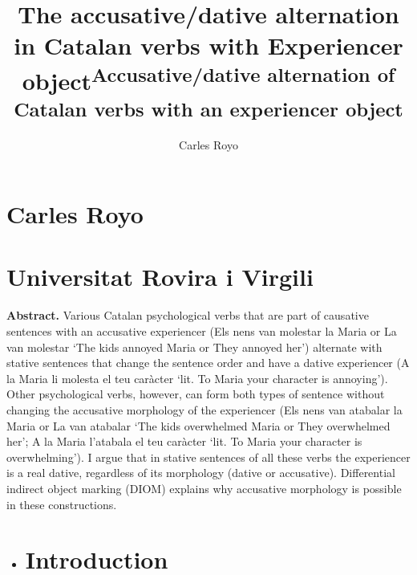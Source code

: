 \documentclass[output=paper,modfonts,nonflat]{langsci/langscibook}
\author{Carles Royo\affiliation{}}
\title{The accusative/dative alternation in Catalan verbs with Experiencer object}
\begin{document}
\maketitle 

\title{\textsuperscript{Accusative/dative alternation of Catalan verbs with an experiencer object}}

\section{}
\section{\textbf{Carles} \textbf{Royo}}
\section{\textbf{Universitat} \textbf{Rovira} \textbf{i} \textbf{Virgili}}
\begin{stylelsAbstract}
\textbf{Abstract.} Various Catalan psychological verbs that are part of causative sentences with an accusative experiencer (\textup{Els nens van molestar la Maria} or \textup{La van molestar} ‘The kids annoyed Maria or They annoyed her’) alternate with stative sentences that change the sentence order and have a dative experiencer (\textup{A la Maria li molesta el teu caràcter} ‘lit. To Maria your character is annoying’). Other psychological verbs, however, can form both types of sentence without changing the accusative morphology of the experiencer (\textup{Els nens van atabalar la Maria} or \textup{La van atabalar} ‘The kids overwhelmed Maria or They overwhelmed her’; \textup{A la Maria l’atabala el teu caràcter} ‘lit. To Maria your character is overwhelming’). I argue that in stative sentences of all these verbs the experiencer is a real dative, regardless of its morphology (dative or accusative). Differential indirect object marking (DIOM) explains why accusative morphology is possible in these constructions.
\end{stylelsAbstract}

\begin{itemize}
\item \section{Introduction}
\end{itemize}
\end{document}
